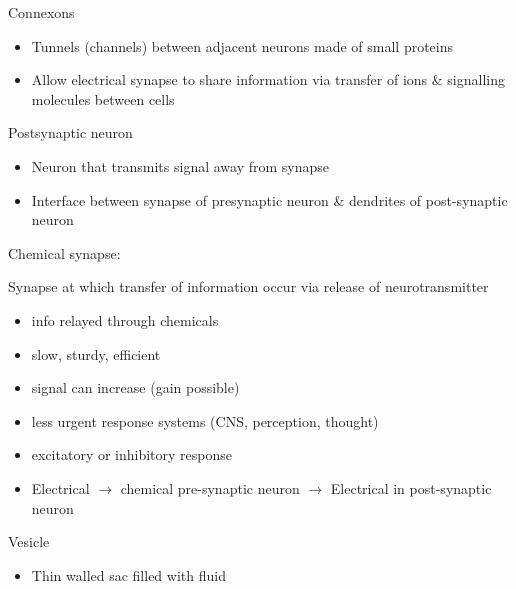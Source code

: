 \documentclass[11pt,fleqn]{book}
\begin{document}
\begin{descriptions}
\begin{itemize}
\begin{itemize}
        \end{itemize}
    \end{itemize}
    \item[Connexons]
    \begin{descriptions}
    \end{descriptions}
    \begin{itemize}
        \item Tunnels (channels) between adjacent neurons made of small proteins
        \item Allow electrical synapse to share information via transfer of ions \& signalling molecules between cells
    \end{itemize}
    \item[Postsynaptic neuron]
    \begin{descriptions}
    \end{descriptions}
    \begin{itemize}
        \item Neuron that transmits signal away from synapse
        \item Interface between synapse of presynaptic neuron \& dendrites of post-synaptic neuron
    \end{itemize}
    \item[Chemical synapse:] 
    \begin{descriptions}
    \end{descriptions}    
    Synapse at which transfer of information occur via release of neurotransmitter
    \begin{itemize}
        \item info relayed through chemicals
        \item slow, sturdy, efficient
        \item signal can increase (gain possible)
        \item less urgent response systems (CNS, perception, thought)
        \item excitatory or inhibitory response
        \item Electrical $\rightarrow$ chemical pre-synaptic neuron $\rightarrow$ Electrical in post-synaptic neuron
    \end{itemize}
    \item[Vesicle]
    \begin{descriptions}
    \end{descriptions}
    \begin{itemize}
        \item Thin walled sac filled with fluid

\end{itemize}
\end{descriptions}
\end{document}
